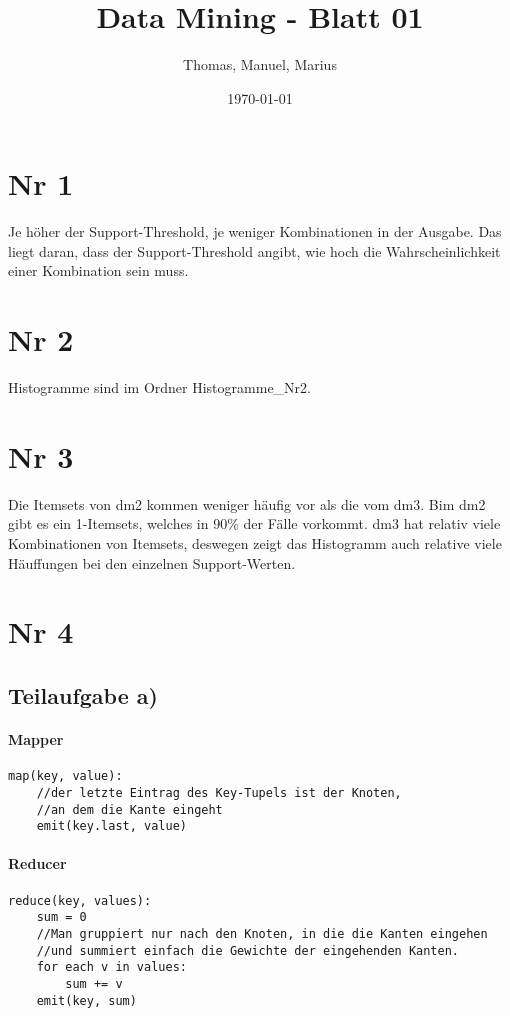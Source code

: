 \documentclass{article}
\title{Data Mining - Blatt 01}
\author{Thomas, Manuel, Marius}
\date{\today}
\begin{document}
\maketitle

\section{Nr 1}
Je höher der Support-Threshold, je weniger Kombinationen in der Ausgabe. Das liegt daran, dass der Support-Threshold angibt, wie hoch die Wahrscheinlichkeit einer Kombination sein muss.

\section{Nr 2}
Histogramme sind im Ordner Histogramme_Nr2.

\section{Nr 3}
Die Itemsets von dm2 kommen weniger häufig vor als die vom dm3. Bim dm2 gibt es ein 1-Itemsets, welches in 90\% der Fälle vorkommt. dm3 hat relativ viele Kombinationen von Itemsets, deswegen zeigt das Histogramm auch relative viele Häuffungen bei den einzelnen Support-Werten.

\section{Nr 4}


\subsection{Teilaufgabe a)}

\paragraph{Mapper}
\begin{lstlisting}
map(key, value):
	//der letzte Eintrag des Key-Tupels ist der Knoten,
	//an dem die Kante eingeht
	emit(key.last, value)
\end{lstlisting}

\paragraph{Reducer}
\begin{lstlisting}
reduce(key, values):
	sum = 0
	//Man gruppiert nur nach den Knoten, in die die Kanten eingehen
	//und summiert einfach die Gewichte der eingehenden Kanten.
	for each v in values:
		sum += v
	emit(key, sum)
\end{lstlisting}
\end{document}
